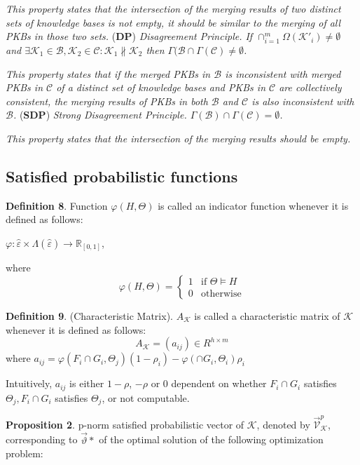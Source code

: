 \documentclass[]{iosart2c}
\begin{document}
    \textit{This property states that the intersection of the merging results of two distinct sets of knowledge bases is not empty, it should be similar to the merging of all PKBs in those two sets.
    }
    (\textbf{DP}) \textit{Disagreement Principle. If $\cap^m_{i=1}\Omega(\mathcal{K}'_i) \neq \emptyset$ and $\exists \mathcal{K}_1 \in \mathcal{B}, \mathcal{K}_2 \in \mathcal{C}: \mathcal{K}_1 \nparallel \mathcal{K}_2$ then $\Gamma(\mathcal{B} \cap \Gamma(\mathcal{C}) \neq \emptyset$.}

    \textit{This property states that if the merged PKBs in $\mathcal{B}$ is inconsistent with merged PKBs in $\mathcal{C}$ of a distinct set of knowledge bases and PKBs in $\mathcal{C}$ are collectively consistent, the merging results of PKBs in both $\mathcal{B}$ and $\mathcal{C}$ is also inconsistent with $\mathcal{B}$.
    }
    (\textbf{SDP}) \textit{Strong Disagreement Principle. $\Gamma(\mathcal{B}) \cap \Gamma(\mathcal{C}) = \emptyset$.}

    \textit{This property states that the intersection of the merging results should be empty.
    }

    \subsection{Satisfied probabilistic functions}

    \textbf{Definition 8}. Function $\varphi(H,\Theta)$ is called an indicator function whenever it is defined as follows:

    $\varphi : \hat{\varepsilon} \times \Lambda(\hat{\varepsilon}) \to \mathbb{R}_{[0,1]}$,

    where $$\varphi(H,\Theta) =
    \begin{cases}
        1    &\text{if $\Theta \models H$} \\
        0    &\text{otherwise}
    \end{cases}
    $$

    \textbf{Definition 9}. (Characteristic Matrix). $A_\mathcal{K}$ is called a characteristic matrix of $\mathcal{K}$ whenever it is defined as follows:
    $$
    A_\mathcal{K} = (a_{ij}) \in R^{h \times m}
    $$
    where
    $a_{ij} = \varphi(F_i \cap G_i,\Theta_j)(1 - \rho_i) - \varphi(\cap G_i,\Theta_i)\rho_i$

    Intuitively, $a_{ij}$ is either $1-\rho$, $-\rho$ or 0 dependent on whether $F_i \cap G_i$ satisfies $\Theta_j, F_i \cap G_i$ satisfies $\Theta_j$, or not computable.

    \textbf{Proposition 2}. p-norm satisfied probabilistic vector of $\mathcal{K}$, denoted by $\vec{\mathcal{V}}^p_\mathcal{K}$, corresponding to $\vec{\vartheta}*$ of the optimal solution of the following optimization problem:
\end{document}

